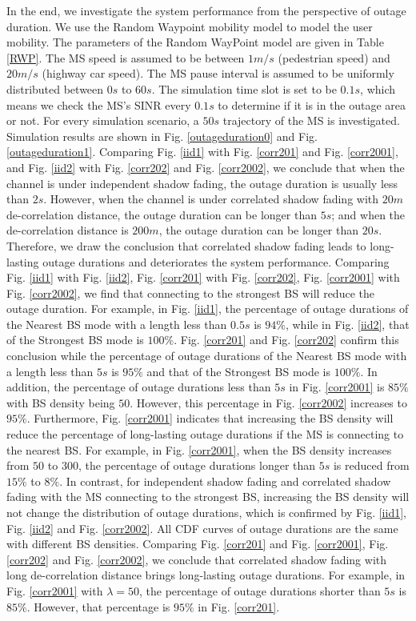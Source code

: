 \documentclass[journal,10pt]{IEEEtran}
\begin{document}
 \par In the end, we investigate the system performance from the perspective of outage duration. We use the Random Waypoint mobility model to model the user mobility. The parameters of the Random WayPoint model are given in Table \ref{RWP}. The MS speed is assumed to be between $1m/s$ (pedestrian speed) and $20m/s$ (highway car speed). The MS pause interval is assumed to be uniformly distributed between $0s$ to $60s$. The simulation time slot is set to be $0.1s$, which means we check the MS's SINR every $0.1s$ to determine if it is in the outage area or not. For every simulation scenario, a $50s$ trajectory of the MS is investigated. Simulation results are shown in Fig. \ref{outageduration0} and Fig. \ref{outageduration1}. Comparing Fig. \ref{iid1} with Fig. \ref{corr201} and Fig. \ref{corr2001}, and Fig. \ref{iid2} with Fig. \ref{corr202} and Fig. \ref{corr2002}, we conclude that when the channel is under independent shadow fading, the outage duration is usually less than $2s$. However,  when the channel is under correlated shadow fading with $20m$ de-correlation distance, the outage duration can be longer than $5s$; and when the de-correlation distance is $200m$, the outage duration can be longer than $20s$. Therefore, we draw the conclusion that correlated shadow fading leads to long-lasting outage durations and deteriorates the system performance. Comparing Fig. \ref{iid1} with Fig. \ref{iid2},  Fig. \ref{corr201} with Fig. \ref{corr202}, Fig. \ref{corr2001} with Fig. \ref{corr2002}, we find that connecting to the strongest BS will reduce the outage duration. For example, in Fig. \ref{iid1}, the percentage of outage durations of the Nearest BS mode with a length less than $0.5s$ is $94\%$, while in Fig. \ref{iid2}, that of the Strongest BS mode is $100\%$.  Fig. \ref{corr201} and Fig. \ref{corr202} confirm this conclusion while the percentage of outage durations of the Nearest BS mode with a length less than $5s$ is $95\%$ and that of the Strongest BS mode is $100\%$. In addition, the percentage of outage durations less than $5s$ in Fig. \ref{corr2001} is $85\%$ with BS density being $50$. However, this percentage in Fig. \ref{corr2002} increases to $95\%$. Furthermore, Fig. \ref{corr2001} indicates that increasing the BS density will reduce the percentage of long-lasting outage durations if the MS is connecting to the nearest BS. For example, in Fig. \ref{corr2001}, when the BS density increases from $50$ to $300$, the percentage of outage durations longer than $5s$ is reduced from $15\%$ to $8\%$. In contrast, for independent shadow fading and correlated shadow fading with the MS connecting to the strongest BS, increasing the BS density will not change the distribution of outage durations, which is confirmed by Fig. \ref{iid1}, Fig. \ref{iid2} and Fig. \ref{corr2002}. All CDF curves of outage durations are the same with different BS densities. Comparing Fig. \ref{corr201} and Fig. \ref{corr2001}, Fig. \ref{corr202} and Fig. \ref{corr2002}, we conclude that correlated shadow fading with long de-correlation distance brings long-lasting outage durations. For example, in Fig. \ref{corr2001} with $\lambda = 50$, the percentage of outage durations shorter than $5s$ is $85\%$. However, that percentage is $95\%$ in Fig. \ref{corr201}.
\end{document}
